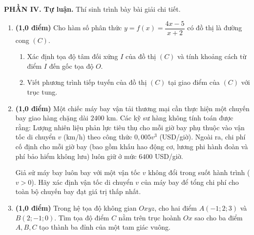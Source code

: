 \documentclass[12pt]{article}
\begin{document}
	\noindent\textbf{PHẦN IV. Tự luận.} Thí sinh trình bày bài giải chi tiết.
	\vspace{2mm}
	
	\begin{enumerate}[label=\textbf{Bài \arabic*.}, leftmargin=*]
		
		\item \textbf{(1,0 điểm)} Cho hàm số phân thức $y = f(x) = \dfrac{4x - 5}{x + 2}$ có đồ thị là đường cong $(C)$. 
		\begin{enumerate}[label=\alph*)]
			\item Xác định tọa độ tâm đối xứng $I$ của đồ thị $(C)$ và tính khoảng cách từ điểm $I$ đến gốc tọa độ $O$.
			\item Viết phương trình tiếp tuyến của đồ thị $(C)$ tại giao điểm của $(C)$ với trục tung.
		\end{enumerate}
		\vspace{2mm}
		
		\item \textbf{(1,0 điểm)} Một chiếc máy bay vận tải thương mại cần thực hiện một chuyến bay giao hàng chặng dài $2400$ km. Các kỹ sư hàng không tính toán được rằng: Lượng nhiên liệu phản lực tiêu thụ cho mỗi giờ bay phụ thuộc vào vận tốc di chuyển $v$ (km/h) theo công thức $0,005v^3$ (USD/giờ). Ngoài ra, chi phí cố định cho mỗi giờ bay (bao gồm khấu hao động cơ, lương phi hành đoàn và phí bảo hiểm không lưu) luôn giữ ở mức $6400$ USD/giờ. 
		
		Giả sử máy bay luôn bay với một vận tốc $v$ không đổi trong suốt hành trình ($v > 0$). Hãy xác định vận tốc di chuyển $v$ của máy bay để tổng chi phí cho toàn bộ chuyến bay đạt giá trị thấp nhất.
		\vspace{2mm}
		
		\item \textbf{(1,0 điểm)} Trong hệ tọa độ không gian $Oxyz$, cho hai điểm $A(-1; 2; 3)$ và $B(2; -1; 0)$. Tìm tọa độ điểm $C$ nằm trên trục hoành $Ox$ sao cho ba điểm $A, B, C$ tạo thành ba đỉnh của một tam giác vuông.
		
	\end{enumerate}
	
\end{document}
